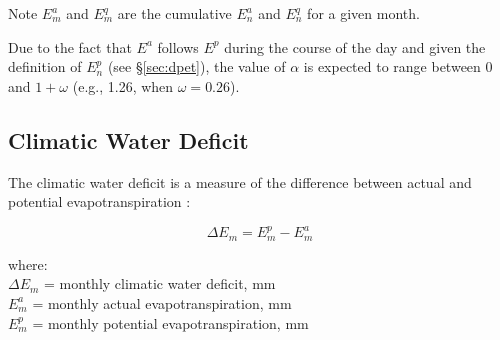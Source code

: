 \noindent Note $E^a_m$ and $E^q_m$ are the cumulative $E^a_n$ and $E^q_n$ for a given month.

Due to the fact that $E^a$ follows $E^p$ during the course of the day and given the definition of $E^p_n$ (see \S \ref{sec:dpet}), the value of $\alpha$ is expected to range between 0 and $1 + \omega$ (e.g., 1.26, when $\omega=0.26$). 

\subsection{Climatic Water Deficit}
\label{sec:cwd}
The climatic water deficit is a measure of the difference between actual and potential evapotranspiration \parencite{stephenson98}:

\begin{equation}
\label{eq:cwd}
	\Delta E_m = E^p_m - E^a_m
\end{equation}

\noindent where:\\
\indent $\Delta E_m$ = monthly climatic water deficit, mm \\
\indent $E^a_m$ = monthly actual evapotranspiration, mm\\
\indent $E^p_m$ = monthly potential evapotranspiration, mm\\

